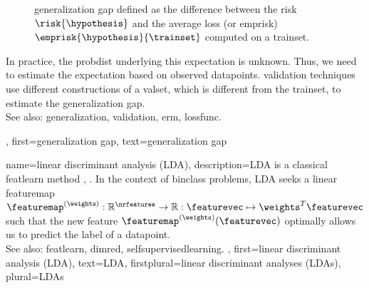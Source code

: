 {{\begin{figure}[H]
		\caption{\Gls{generalization} gap defined as the difference between the 
			\gls{risk} $\risk{\hypothesis}$ and the average \gls{loss} (or \gls{emprisk}) 
			$\emprisk{\hypothesis}{\trainset}$ computed on a \gls{trainset}.}
		\end{figure}
	  	In practice, the \gls{probdist} underlying this \gls{expectation} is 
	  	unknown. Thus, we need to estimate the \gls{expectation} based on 
	  	observed \glspl{datapoint}. \Gls{validation} techniques 
	  	use different constructions of a \gls{valset}, which is different from 
	  	the \gls{trainset}, to estimate the \gls{generalization} gap.
		\\
		See also: \gls{generalization}, \gls{validation}, \gls{erm}, \gls{lossfunc}.}, 
	first={generalization gap}, 
	text={generalization gap}
}

{name={linear discriminant analysis (LDA)}, 
	description={LDA is a classical 
		\gls{featlearn} method \cite{BishopBook}, \cite{Fisher1936Taxonomic}. 
		In the context of \gls{binclass} problems, 
		LDA seeks a linear \gls{featuremap} $\featuremap^{(\weights)}: \mathbb{R}^{\nrfeatures} 
		\rightarrow \mathbb{R}: \featurevec \mapsto \weights^{T} \featurevec$ 
		such that the new \gls{feature} $\featuremap^{(\weights)}(\featurevec)$ 
		optimally allows us to predict the \gls{label} of a \gls{datapoint}. 
		\\
		See also: \gls{featlearn}, \gls{dimred}, \gls{selfsupervisedlearning}. }, 
 	first={linear discriminant analysis (LDA)},
 	text={LDA}, 
 	firstplural={linear discriminant analyses (LDAs)},
 	plural={LDAs}
}

